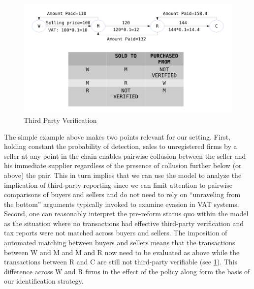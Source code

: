 \begin{figure}[t] 
\caption{Third Party Verification}
\label{fig:matching_model}
\includegraphics[width=.9\textwidth]{graphs/example_5.png}
\end{figure}

The simple example above makes two points relevant for our setting. First, holding constant the probability of detection, sales to unregistered firms by a seller at any point in the chain enables pairwise collusion between the seller and his immediate supplier regardless of the presence of collusion further below (or above) the pair. This in turn implies that we can use the \cite{kleven2016can} model to analyze the implication of third-party reporting since we can limit attention to pairwise comparisons of buyers and sellers and do not need to rely on ``unraveling from the bottom'' arguments typically invoked to examine evasion in VAT systems. Second, one can reasonably interpret the pre-reform status quo within the model as the situation where no transactions had effective third-party verification and tax reports were not matched across buyers and sellers. The imposition of automated matching between buyers and sellers means that the transactions between W and M and M and R now need to be evaluated as above while the transactions between R and C are still not third-party verifiable (see \cref{fig:matching_model}). This difference across W and R firms in the effect of the policy along form the basis of our identification strategy.


